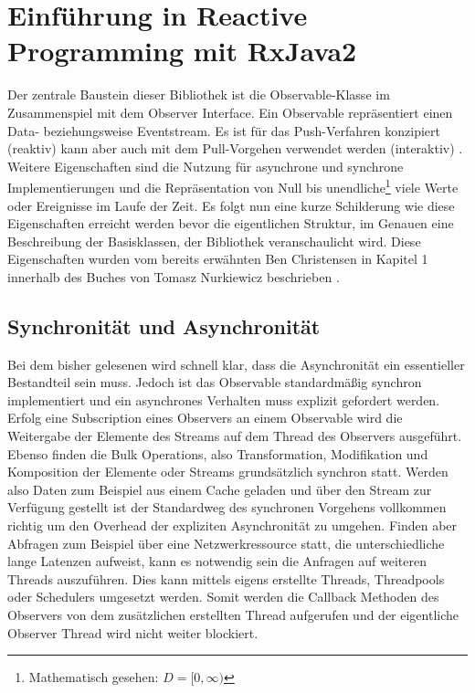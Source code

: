 \chapter{Einführung in Reactive Programming mit RxJava2}\label{rp_einfuehrung}
Der zentrale Baustein dieser Bibliothek ist die Observable-Klasse im Zusammenspiel mit dem Observer Interface. Ein Observable repräsentiert einen Data- beziehungsweise Eventstream. Es ist für das Push-Verfahren konzipiert (reaktiv) kann aber auch mit dem Pull-Vorgehen verwendet werden (interaktiv) \cite{Nurkiewicz.2017}. Weitere Eigenschaften sind die Nutzung für asynchrone und synchrone Implementierungen und die Repräsentation von Null bis unendliche\footnote{Mathematisch gesehen: $D = [0, \infty)$} viele Werte oder Ereignisse im Laufe der Zeit. Es folgt nun eine kurze Schilderung wie diese Eigenschaften erreicht werden bevor die eigentlichen Struktur, im Genauen eine Beschreibung der Basisklassen, der Bibliothek veranschaulicht wird. Diese Eigenschaften wurden vom bereits erwähnten Ben Christensen in Kapitel 1 innerhalb des Buches von Tomasz Nurkiewicz beschrieben \cite{Nurkiewicz.2017}. 
\section{Synchronität und Asynchronität}
Bei dem bisher gelesenen wird schnell klar, dass die Asynchronität ein essentieller Bestandteil sein muss. Jedoch ist das Observable standardmäßig synchron implementiert und ein asynchrones Verhalten muss explizit gefordert werden. Erfolg eine Subscription eines Observers an einem Observable wird die Weitergabe der Elemente des Streams auf dem Thread des Observers ausgeführt. Ebenso finden die Bulk Operations, also Transformation, Modifikation und Komposition der Elemente oder Streams grundsätzlich synchron statt. Werden also Daten zum Beispiel aus einem Cache geladen und über den Stream zur Verfügung gestellt ist der Standardweg des synchronen Vorgehens vollkommen richtig um den Overhead der expliziten Asynchronität zu umgehen. Finden aber Abfragen zum Beispiel über eine Netzwerkressource statt, die unterschiedliche lange Latenzen aufweist, kann es notwendig sein die Anfragen auf weiteren Threads auszuführen. Dies kann mittels eigens erstellte Threads, Threadpools oder Schedulers umgesetzt werden. Somit werden die Callback Methoden des Observers von dem zusätzlichen erstellten Thread aufgerufen und der eigentliche Observer Thread wird nicht weiter blockiert.

